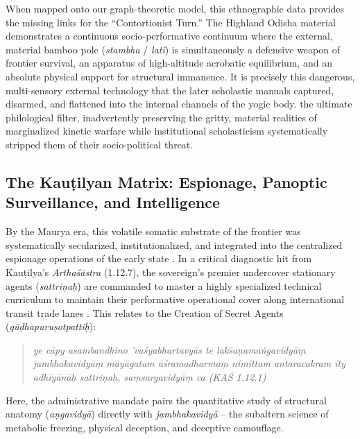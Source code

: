 \documentclass[11pt,twoside,letterpaper]{article}
\begin{document}
When mapped onto our graph-theoretic model, this ethnographic data provides the missing links for the ``Contortionist Turn.'' The Highland Odisha material demonstrates a continuous socio-performative continuum where the external, material bamboo pole (\textit{stambha} / \textit{lati}) is simultaneously a defensive weapon of frontier survival, an apparatus of high-altitude acrobatic equilibrium, and an absolute physical support for structural immanence. It is precisely this dangerous, multi-sensory external technology that the later scholastic manuals captured, disarmed, and flattened into the internal channels of the yogic body. the ultimate philological filter, inadvertently preserving the gritty, material realities of marginalized kinetic warfare while institutional scholasticism systematically stripped them of their socio-political threat.

\subsection{The Kauṭilyan Matrix: Espionage, Panoptic Surveillance, and Intelligence}
By the Maurya era, this volatile somatic substrate of the frontier was systematically secularized, institutionalized, and integrated into the centralized espionage operations of the early state \citep{Kangle1969}. In a critical diagnostic hit from Kauṭilya’s \textit{Arthaśāstra} (1.12.7), the sovereign’s premier undercover stationary agents (\textit{sattriṇaḥ}) are commanded to master a highly specialized technical curriculum to maintain their performative operational cover along international transit trade lanes \citep{Kangle1969}. This relates to the Creation of Secret Agents ({\textit{gūḍhapuruṣotpattiḥ}}):

\begin{quote}
\noindent\textit{ye cāpy asambandhino 'vaśyabhartavyās te laks̄aṇama\.{n}gavidyāṃ jambhakavidyāṃ māyāgatam āśramadharmaṃ nimittam antaracakram ity adhīyānāḥ sattriṇaḥ, saṃsargavidyāṃ ca (KAŚ 1.12.1)}
\end{quote}

Here, the administrative mandate pairs the quantitative study of structural anatomy (\textit{aṇgavidyā}) directly with \textit{jambhakavidyā} – the subaltern science of metabolic freezing, physical deception, and deceptive camouflage.
\end{document}
